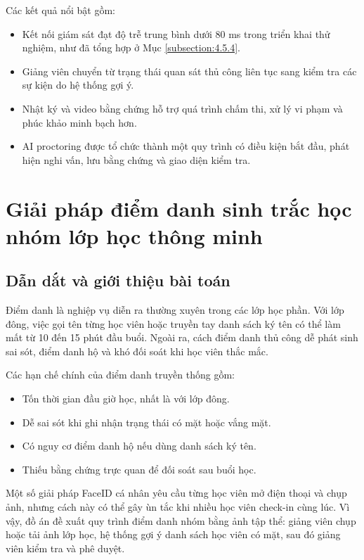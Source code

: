 \documentclass[../DoAn.tex]{subfiles}
\begin{document}
Các kết quả nổi bật gồm:
\begin{itemize}
    \item Kết nối giám sát đạt độ trễ trung bình dưới 80 ms trong triển khai thử nghiệm, như đã tổng hợp ở Mục \ref{subsection:4.5.4}.
    \item Giảng viên chuyển từ trạng thái quan sát thủ công liên tục sang kiểm tra các sự kiện do hệ thống gợi ý.
    \item Nhật ký và video bằng chứng hỗ trợ quá trình chấm thi, xử lý vi phạm và phúc khảo minh bạch hơn.
    \item AI proctoring được tổ chức thành một quy trình có điều kiện bắt đầu, phát hiện nghi vấn, lưu bằng chứng và giao diện kiểm tra.
\end{itemize}

\section{Giải pháp điểm danh sinh trắc học nhóm lớp học thông minh}
\label{section:5.2}

\subsection{Dẫn dắt và giới thiệu bài toán}
Điểm danh là nghiệp vụ diễn ra thường xuyên trong các lớp học phần. Với lớp đông, việc gọi tên từng học viên hoặc truyền tay danh sách ký tên có thể làm mất từ 10 đến 15 phút đầu buổi. Ngoài ra, cách điểm danh thủ công dễ phát sinh sai sót, điểm danh hộ và khó đối soát khi học viên thắc mắc.

Các hạn chế chính của điểm danh truyền thống gồm:
\begin{itemize}
    \item Tốn thời gian đầu giờ học, nhất là với lớp đông.
    \item Dễ sai sót khi ghi nhận trạng thái có mặt hoặc vắng mặt.
    \item Có nguy cơ điểm danh hộ nếu dùng danh sách ký tên.
    \item Thiếu bằng chứng trực quan để đối soát sau buổi học.
\end{itemize}

Một số giải pháp FaceID cá nhân yêu cầu từng học viên mở điện thoại và chụp ảnh, nhưng cách này có thể gây ùn tắc khi nhiều học viên check-in cùng lúc. Vì vậy, đồ án đề xuất quy trình điểm danh nhóm bằng ảnh tập thể: giảng viên chụp hoặc tải ảnh lớp học, hệ thống gợi ý danh sách học viên có mặt, sau đó giảng viên kiểm tra và phê duyệt.
\end{document}
